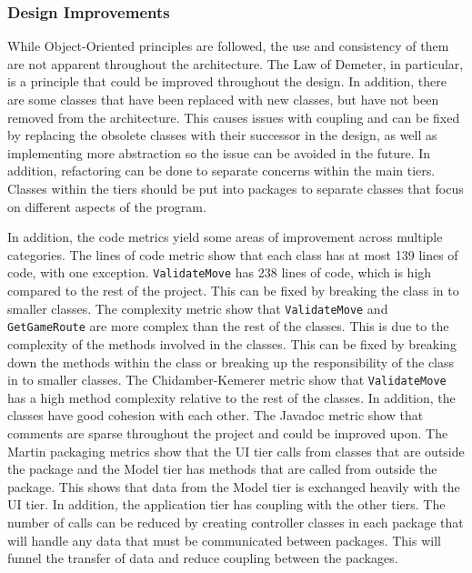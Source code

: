 \hypertarget{design-improvements}{%
\subsubsection{Design Improvements}\label{design-improvements}}

While Object-Oriented principles are followed, the use and consistency
of them are not apparent throughout the architecture. The Law of
Demeter, in particular, is a principle that could be improved throughout
the design. In addition, there are some classes that have been replaced
with new classes, but have not been removed from the architecture. This
causes issues with coupling and can be fixed by replacing the obsolete
classes with their successor in the design, as well as implementing more
abstraction so the issue can be avoided in the future. In addition,
refactoring can be done to separate concerns within the main tiers.
Classes within the tiers should be put into packages to separate classes
that focus on different aspects of the program.

In addition, the code metrics yield some areas of improvement across
multiple categories. The lines of code metric show that each class has
at most 139 lines of code, with one exception. \texttt{ValidateMove} has
238 lines of code, which is high compared to the rest of the project.
This can be fixed by breaking the class in to smaller classes. The
complexity metric show that \texttt{ValidateMove} and
\texttt{GetGameRoute} are more complex than the rest of the classes.
This is due to the complexity of the methods involved in the classes.
This can be fixed by breaking down the methods within the class or
breaking up the responsibility of the class in to smaller classes. The
Chidamber-Kemerer metric show that \texttt{ValidateMove} has a high
method complexity relative to the rest of the classes. In addition, the
classes have good cohesion with each other. The Javadoc metric show that
comments are sparse throughout the project and could be improved upon.
The Martin packaging metrics show that the UI tier calls from classes
that are outside the package and the Model tier has methods that are
called from outside the package. This shows that data from the Model
tier is exchanged heavily with the UI tier. In addition, the application
tier has coupling with the other tiers. The number of calls can be
reduced by creating controller classes in each package that will handle
any data that must be communicated between packages. This will funnel
the transfer of data and reduce coupling between the packages.

